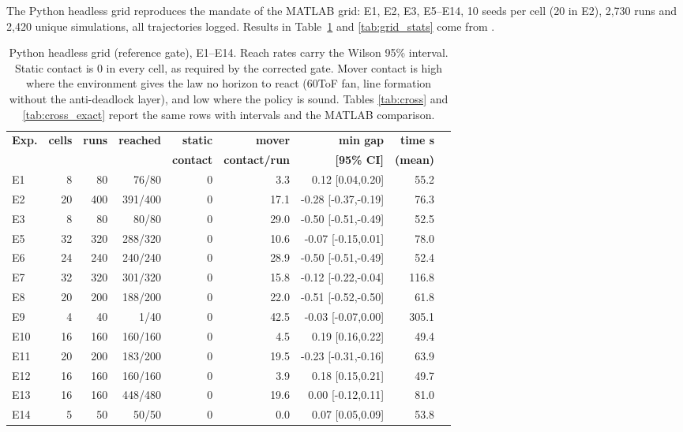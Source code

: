 The Python headless grid reproduces the mandate of the MATLAB grid: E1, E2,
E3, E5--E14, 10 seeds per cell (20 in E2), 2,730 runs and 2,420 unique
simulations, all trajectories logged. Results in
Table~\ref{tab:grid} and \ref{tab:grid_stats} come from
.

\begin{table}[H]
\centering\footnotesize
\begin{tabular}{@{}lrrrrrrrr@{}}
\toprule
\textbf{Exp.} & \textbf{cells} & \textbf{runs} & \textbf{reached} & \textbf{static} & \textbf{mover} & \textbf{min gap} & \textbf{time s}\\
 & & & & \textbf{contact} & \textbf{contact/run} & \textbf{[95\% CI]} & \textbf{(mean)}\\
\midrule
E1 & 8 & 80 & 76/80 & 0 & 3.3 & 0.12 [0.04,0.20] & 55.2\\
E2 & 20 & 400 & 391/400 & 0 & 17.1 & -0.28 [-0.37,-0.19] & 76.3\\
E3 & 8 & 80 & 80/80 & 0 & 29.0 & -0.50 [-0.51,-0.49] & 52.5\\
E5 & 32 & 320 & 288/320 & 0 & 10.6 & -0.07 [-0.15,0.01] & 78.0\\
E6 & 24 & 240 & 240/240 & 0 & 28.9 & -0.50 [-0.51,-0.49] & 52.4\\
E7 & 32 & 320 & 301/320 & 0 & 15.8 & -0.12 [-0.22,-0.04] & 116.8\\
E8 & 20 & 200 & 188/200 & 0 & 22.0 & -0.51 [-0.52,-0.50] & 61.8\\
E9 & 4 & 40 & 1/40 & 0 & 42.5 & -0.03 [-0.07,0.00] & 305.1\\
E10 & 16 & 160 & 160/160 & 0 & 4.5 & 0.19 [0.16,0.22] & 49.4\\
E11 & 20 & 200 & 183/200 & 0 & 19.5 & -0.23 [-0.31,-0.16] & 63.9\\
E12 & 16 & 160 & 160/160 & 0 & 3.9 & 0.18 [0.15,0.21] & 49.7\\
E13 & 16 & 160 & 448/480 & 0 & 19.6 & 0.00 [-0.12,0.11] & 81.0\\
E14 & 5 & 50 & 50/50 & 0 & 0.0 & 0.07 [0.05,0.09] & 53.8\\
\bottomrule
\end{tabular}
\caption{Python headless grid (reference gate), E1--E14. Reach rates carry
the Wilson 95\% interval. Static contact is 0 in every cell, as required by
the corrected gate. Mover contact is high where the environment gives the
law no horizon to react (60\degree ToF fan, line formation without the
anti-deadlock layer), and low where the policy is sound. Tables
\ref{tab:cross} and \ref{tab:cross_exact} report the same rows with
intervals and the MATLAB comparison.}
\label{tab:grid}
\end{table}

